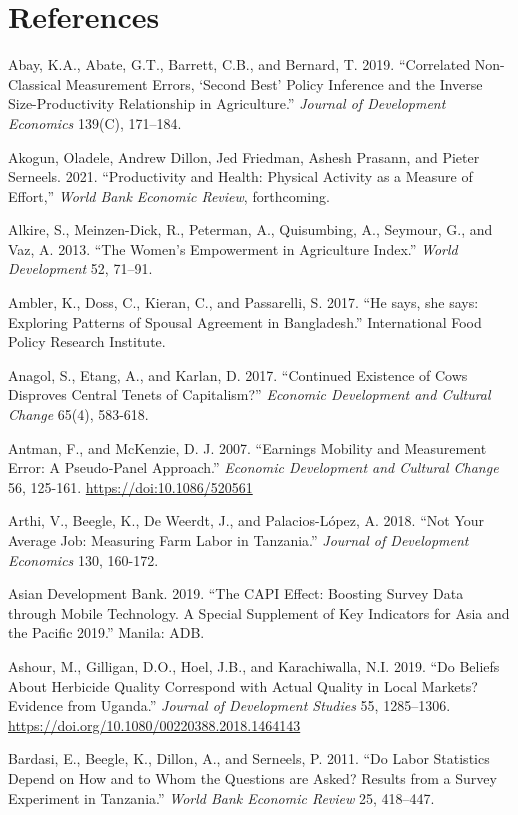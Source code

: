\documentclass[
]{book}
\begin{document}
\hypertarget{references}{%
\chapter{References}\label{references}}

Abay, K.A., Abate, G.T., Barrett, C.B., and Bernard, T. 2019. ``Correlated Non-Classical Measurement Errors, `Second Best' Policy Inference and the Inverse Size-Productivity Relationship in Agriculture.'' \emph{Journal of Development Economics} 139(C), 171--184.

Akogun, Oladele, Andrew Dillon, Jed Friedman, Ashesh Prasann, and Pieter Serneels. 2021. ``Productivity and Health: Physical Activity as a Measure of Effort,'' \emph{World Bank Economic Review}, forthcoming.

Alkire, S., Meinzen-Dick, R., Peterman, A., Quisumbing, A., Seymour, G., and Vaz, A. 2013. ``The Women's Empowerment in Agriculture Index.'' \emph{World Development} 52, 71--91.

Ambler, K., Doss, C., Kieran, C., and Passarelli, S. 2017. ``He says, she says: Exploring Patterns of Spousal Agreement in Bangladesh.'' International Food Policy Research Institute.

Anagol, S., Etang, A., and Karlan, D. 2017. ``Continued Existence of Cows Disproves Central Tenets of Capitalism?'' \emph{Economic Development and Cultural Change} 65(4), 583-618.

Antman, F., and McKenzie, D. J. 2007. ``Earnings Mobility and Measurement Error: A Pseudo‐Panel Approach.'' \emph{Economic Development and Cultural Change} 56, 125-161. \url{https://doi:10.1086/520561}

Arthi, V., Beegle, K., De Weerdt, J., and Palacios-López, A. 2018. ``Not Your Average Job: Measuring Farm Labor in Tanzania.'' \emph{Journal of Development Economics} 130, 160-172.

Asian Development Bank. 2019. ``The CAPI Effect: Boosting Survey Data through Mobile Technology. A Special Supplement of Key Indicators for Asia and the Pacific 2019.'' Manila: ADB.

Ashour, M., Gilligan, D.O., Hoel, J.B., and Karachiwalla, N.I. 2019. ``Do Beliefs About Herbicide Quality Correspond with Actual Quality in Local Markets? Evidence from Uganda.'' \emph{Journal of Development Studies} 55, 1285--1306. \url{https://doi.org/10.1080/00220388.2018.1464143}

Bardasi, E., Beegle, K., Dillon, A., and Serneels, P. 2011. ``Do Labor Statistics Depend on How and to Whom the Questions are Asked? Results from a Survey Experiment in Tanzania.'' \emph{World Bank Economic Review} 25, 418--447.
\end{document}
